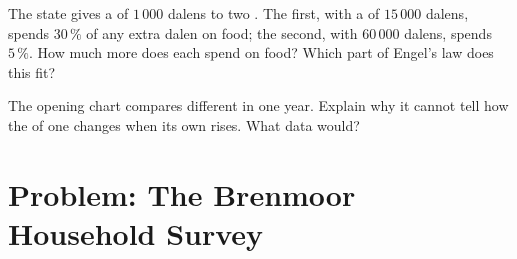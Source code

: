 \begin{exercise}[$\star\star\star$]\label{exo:g7:households:11}
The state gives a  of $1\,000$ dalens to two . The first, with a  of $15\,000$ dalens, spends $30\,\%$ of any extra dalen on food; the second, with
$60\,000$ dalens, spends $5\,\%$. How much more does each spend on food? Which part of
Engel's law does this fit?
\end{exercise}

\begin{exercise}[$\star\star\star$]\label{exo:g7:households:12}
The opening chart compares different  in one year. Explain why it cannot tell how the
 of one  changes when its own  rises. What data would?
\end{exercise}

\section{Problem: The Brenmoor Household Survey}

